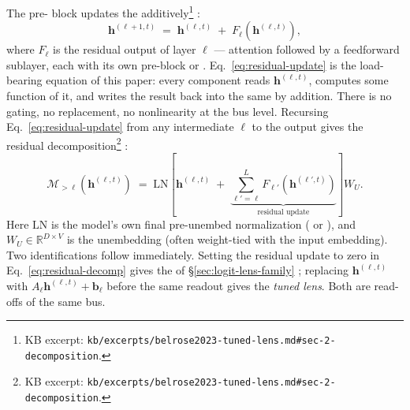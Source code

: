 The pre-  block updates the 
additively\footnote{KB excerpt:
\texttt{kb/excerpts/belrose2023-tuned-lens.md\#sec-2-decomposition}.}
\citep[\S 2, Eq.~1]{belrose2023-tuned-lens}:
\begin{equation}
  \mathbf{h}^{(\ell+1, t)}
  \;=\;
  \mathbf{h}^{(\ell, t)} \;+\; F_\ell\!\left(\mathbf{h}^{(\ell, t)}\right),
  \label{eq:residual-update}
\end{equation}
where $F_\ell$ is the residual output of layer $\ell$ --- attention
followed by a feedforward sublayer, each with its own pre-block
 or . Eq.~\eqref{eq:residual-update} is the
load-bearing equation of this paper: every component reads
$\mathbf{h}^{(\ell, t)}$, computes some function of it, and writes the
result back into the same  by addition. There is no
gating, no replacement, no nonlinearity at the bus level. Recursing
Eq.~\eqref{eq:residual-update} from any intermediate $\ell$ to the
output gives the residual decomposition\footnote{KB excerpt:
\texttt{kb/excerpts/belrose2023-tuned-lens.md\#sec-2-decomposition}.}
\citep[\S 2, Eq.~2]{belrose2023-tuned-lens}:
\begin{equation}
  \mathcal{M}_{>\ell}\!\left(\mathbf{h}^{(\ell, t)}\right)
  \;=\;
  \mathrm{LN}\!\left[\mathbf{h}^{(\ell, t)}
  \;+\; \underbrace{\sum_{\ell' = \ell}^{L} F_{\ell'}\!\left(\mathbf{h}^{(\ell', t)}\right)}_{\text{residual update}}\right] W_U.
  \label{eq:residual-decomp}
\end{equation}
Here $\mathrm{LN}$ is the model's own final pre-unembed normalization
( or ), and $W_U \in \mathbb{R}^{D \times V}$ is the
unembedding (often weight-tied with the input embedding). Two
identifications follow immediately. Setting the residual update to
zero in Eq.~\eqref{eq:residual-decomp} gives the \emph{}
of \S\ref{sec:logit-lens-family} \citep[\S 2,
Eq.~3]{belrose2023-tuned-lens}; replacing
$\mathbf{h}^{(\ell, t)}$ with $A_\ell\mathbf{h}^{(\ell, t)} +
\mathbf{b}_\ell$ before the same readout gives the \emph{tuned
lens}. Both are read-offs of the same bus.

